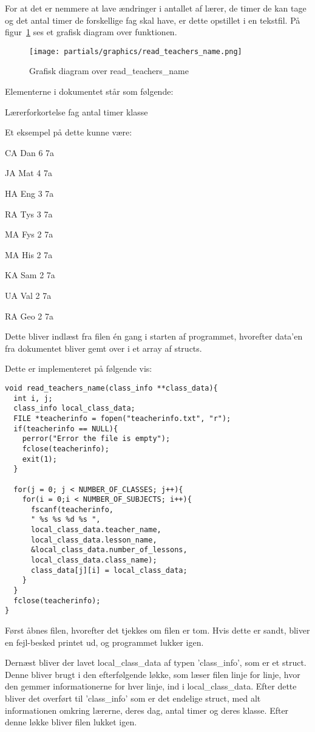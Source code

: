 For at det er nemmere at lave ændringer i antallet af lærer, de timer de kan tage og det antal timer de forskellige fag skal have, er dette opstillet i en tekstfil. På figur~\ref{fig:datacollect} ses et grafisk diagram over funktionen.
\begin{figure}[!h]
\texttt{[image: partials/graphics/read\_teachers\_name.png]}
\caption{Grafisk diagram over read\_teachers\_name}
\label{fig:datacollect}
\end{figure}
Elementerne i dokumentet står som følgende:

Lærerforkortelse fag antal timer klasse

Et eksempel på dette kunne være:

    CA Dan 6 7a

    JA Mat 4 7a

    HA Eng 3 7a

    RA Tys 3 7a

    MA Fys 2 7a

    MA His 2 7a

    KA Sam 2 7a

    UA Val 2 7a

    RA Geo 2 7a

Dette bliver indlæst fra filen én gang i starten af programmet, hvorefter data’en fra dokumentet bliver gemt over i et array af structs.

Dette er implementeret på følgende vis:

\begin{lstlisting}
void read_teachers_name(class_info **class_data){ 
  int i, j;
  class_info local_class_data;
  FILE *teacherinfo = fopen("teacherinfo.txt", "r");
  if(teacherinfo == NULL){
    perror("Error the file is empty");
    fclose(teacherinfo);
    exit(1);
  }

  for(j = 0; j < NUMBER_OF_CLASSES; j++){
    for(i = 0;i < NUMBER_OF_SUBJECTS; i++){
      fscanf(teacherinfo,
      " %s %s %d %s ",
      local_class_data.teacher_name, 
      local_class_data.lesson_name, 
      &local_class_data.number_of_lessons, 
      local_class_data.class_name);
      class_data[j][i] = local_class_data;
    } 
  }  
  fclose(teacherinfo);
}
\end{lstlisting}

Først åbnes filen, hvorefter det tjekkes om filen er tom. Hvis dette er sandt, bliver en fejl-besked printet ud, og programmet lukker igen.

Dernæst bliver der lavet local\_class\_data af typen ’class\_info’, som er et struct. Denne bliver brugt i den efterfølgende løkke, som læser filen linje for linje, hvor den gemmer informationerne for hver linje, ind i local\_class\_data. Efter dette bliver det overført til ’class\_info’ som er det endelige struct, med alt informationen omkring lærerne, deres dag, antal timer og deres klasse. Efter denne løkke bliver filen lukket igen.